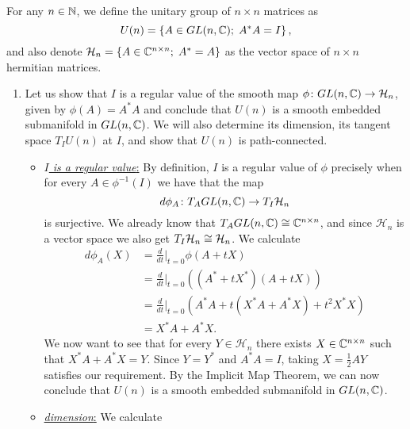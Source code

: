\documentclass[a4paper, 12pt]{article}
\begin{document}
\begin{Exercise}
    For any $n \in \mathbb{N}$, we define the unitary group of $n \times n$ matrices as
    \[
        U(n) = \left\{ A \in GL(n, \mathbb{C}) ; \; A^*A = I \right\},
    \]
    and also denote $\mathcal{H}_n = \left\{ A \in \mathbb{C}^{n \times n} ; \; A^* = A \right\}$ as the vector space of $n \times n$ hermitian matrices.
    \begin{enumerate}[label=(\roman*)]
        \item
            Let us show that $I$ is a regular value of the smooth map $\phi \colon GL(n, \mathbb{C}) \to \mathcal{H}_n$,
            given by $\phi(A) = A^* A$ and conclude that $U(n)$ is a smooth embedded submanifold in $GL(n, \mathbb{C})$.
            We will also determine its dimension, its tangent space $T_IU(n)$ at $I$, and show that $U(n)$ is path-connected.
            \begin{itemize}
                \item \underline{\emph{$I$ is a regular value}:}
                    By definition, $I$ is a regular value of $\phi$ precisely when for every $A \in \phi^{-1}(I)$ we have that the map
                    \[
                        d\phi_A \colon T_AGL(n, \mathbb{C}) \to T_I\mathcal{H}_n
                    \]
                    is surjective. We already know that $T_AGL(n, \mathbb{C}) \cong \mathbb{C}^{n\times n}$,
                    and since $\mathcal{H}_n$ is a vector space we also get $T_I\mathcal{H}_n \cong \mathcal{H}_n$.
                    We calculate
                    \begin{align*}
                        d\phi_A(X)
                        &= \frac{d}{dt}|_{t = 0}\phi(A + tX) \\
                        &= \frac{d}{dt}|_{t = 0}\left( (A^* + tX^*)(A + tX) \right) \\
                        &= \frac{d}{dt}|_{t = 0} (A^*A + t(X^*A + A^*X) + t^2X^*X) \\
                        &= X^*A + A^*X.
                    \end{align*}
                    We now want to see that for every $Y \in \mathcal{H}_n$ there exists $X \in \mathbb{C}^{n\times n}$ such that $X^*A + A^*X = Y$.
                    Since $Y = Y^*$ and $A^*A = I$, taking $X = \frac{1}{2}AY$ satisfies our requirement.
                    By the Implicit Map Theorem, we can now conclude that $U(n)$ is a smooth embedded submanifold in $GL(n, \mathbb{C})$.
                \item \underline{\emph{dimension}:}
                    We calculate
                    \[
\]
\end{itemize}
\end{enumerate}
\end{Exercise}
\end{document}
